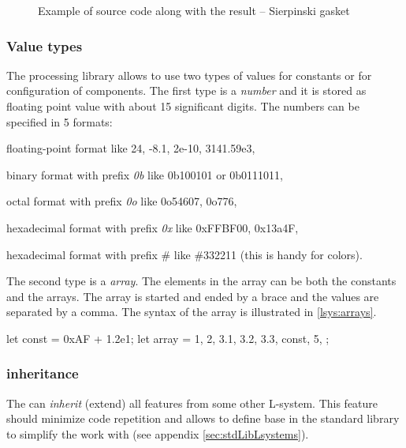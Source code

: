 \begin{figure}[h!]
	\subfloat{
		\usebox{\lstBoxParams}
	} \hfill
	\caption{Example of source code along with the result -- Sierpinski gasket}
	\label{fig:scExample}
\end{figure}


\subsubsection{Value types}

The \lsystem processing library allows to use two types of values for constants or for configuration of components.
The first type is a \emph{number} and it is stored as floating point value with about 15 significant digits.
The numbers can be specified in 5 formats:

\begin{itemize*}
	\item floating-point format like 24, -8.1, 2e-10, 3141.59e3,
	\item binary format with prefix \emph{0b} like 0b100101 or 0b0111011,
	\item octal format with prefix \emph{0o} like 0o54607, 0o776,
	\item hexadecimal format with prefix \emph{0x} like 0xFFBF00, 0x13a4F,
	\item hexadecimal format with prefix \# like \#332211 (this is handy for colors).
\end{itemize*}

The second type is a \emph{array}.
The elements in the array can be both the constants and the arrays.
The array is started and ended by a brace and the values are separated by a comma.
The syntax of the array is illustrated in \autoref{lsys:arrays}.

\begin{Lsystem}[label=lsys:arrays,caption={Example of array syntax.}]
let const = 0xAF + 1.2e1;
let array = {1, 2, {3.1, 3.2, 3.3}, const, 5, {}};
\end{Lsystem}


\subsubsection{\lsystem inheritance}

The \lsystem can \emph{inherit} (extend) all features from some other L-system.
This feature should minimize code repetition and allows to define base \lsystems in the standard library to simplify the work with \lsystems (see appendix \ref{sec:stdLibLsystems}).

